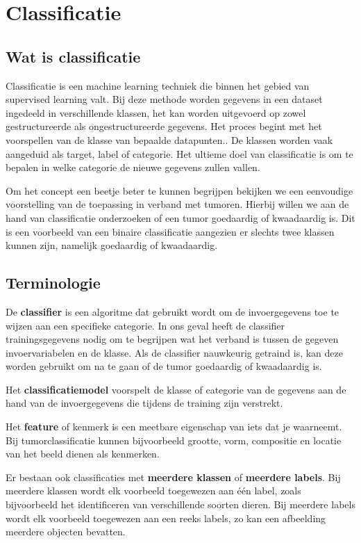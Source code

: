 \documentclass[TeamE-eindrapport]{subfiles}
\begin{document}
\chapter{Classificatie}
\section{Wat is classificatie}

Classificatie is een machine learning techniek die binnen het gebied van supervised learning valt. Bij deze methode worden gegevens in een dataset ingedeeld in verschillende klassen, het kan worden uitgevoerd op zowel gestructureerde als ongestructureerde gegevens. Het proces begint met het voorspellen van de klasse van bepaalde datapunten.. De klassen worden vaak aangeduid als target, label of categorie. Het ultieme doel van classificatie is om te bepalen in welke categorie de nieuwe gegevens zullen vallen.

Om het concept een beetje beter te kunnen begrijpen bekijken we een eenvoudige voorstelling van de toepassing in verband met tumoren. Hierbij willen we aan de hand van classificatie onderzoeken of een tumor goedaardig of kwaadaardig is. Dit is een voorbeeld van een binaire classificatie aangezien er slechts twee klassen kunnen zijn, namelijk goedaardig of kwaadaardig.


\section{Terminologie}

De \textbf{classifier} is een algoritme dat gebruikt wordt om de invoergegevens toe te wijzen aan een specifieke categorie. In ons geval heeft de classifier trainingsgegevens nodig om te begrijpen wat het verband is tussen de gegeven invoervariabelen en de klasse. Als de classifier nauwkeurig getraind is, kan deze worden gebruikt om na te gaan of de tumor goedaardig of kwaadaardig is.

Het \textbf{classificatiemodel} voorspelt de klasse of categorie van de gegevens aan de hand van de invoergegevens die tijdens de training zijn verstrekt.

Het \textbf{feature} of kenmerk is een meetbare eigenschap van iets dat je waarneemt. Bij tumorclassificatie kunnen bijvoorbeeld grootte, vorm, compositie en locatie van het beeld dienen als kenmerken.

Er bestaan ook classificaties met \textbf{meerdere klassen} of \textbf{meerdere labels}. Bij meerdere klassen wordt elk voorbeeld toegewezen aan één label, zoals bijvoorbeeld het identificeren van verschillende soorten dieren.  Bij meerdere labels wordt elk voorbeeld toegewezen aan een reeks labels, zo kan een afbeelding meerdere objecten bevatten.
\end{document}
